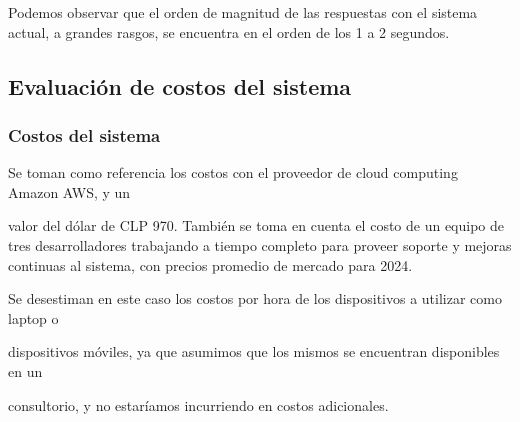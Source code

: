 \documentclass[10pt]{article}
\begin{document}
\vspace{2\baselineskip}
Podemos observar que el orden de magnitud de las respuestas con el sistema actual, a grandes rasgos, se encuentra en el orden de los 1 a 2 segundos.

\vspace{1\baselineskip}
\subsection{Evaluación de costos del sistema}

\subsubsection{Costos del sistema}

\vspace{1\baselineskip}
Se toman como referencia los costos con el proveedor de cloud computing Amazon AWS, y un

valor del dólar de CLP 970. También se toma en cuenta el costo de un equipo de tres desarrolladores trabajando a tiempo completo para proveer soporte y mejoras continuas al sistema, con precios promedio de mercado para 2024.

\vspace{1\baselineskip}
Se desestiman en este caso los costos por hora de los dispositivos a utilizar como laptop o

dispositivos móviles, ya que asumimos que los mismos se encuentran disponibles en un

consultorio, y no estaríamos incurriendo en costos adicionales.
\end{document}
